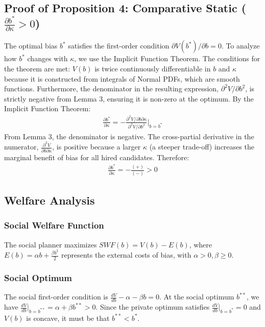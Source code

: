 \subsection{Proof of Proposition 4: Comparative Static ($\frac{\partial b^*}{\partial \kappa} > 0$)}

The optimal bias $b^*$ satisfies the first-order condition $\partial V(b^*)/\partial b = 0$. To analyze how $b^*$ changes with $\kappa$, we use the Implicit Function Theorem. The conditions for the theorem are met: $V(b)$ is twice continuously differentiable in $b$ and $\kappa$ because it is constructed from integrals of Normal PDFs, which are smooth functions. Furthermore, the denominator in the resulting expression, $\partial^2 V / \partial b^2$, is strictly negative from Lemma 3, ensuring it is non-zero at the optimum. By the Implicit Function Theorem:
\begin{align}
\frac{\partial b^*}{\partial \kappa} = -\frac{\partial^2 V / \partial b \partial \kappa}{\partial^2 V / \partial b^2}\bigg|_{b=b^*}
\end{align}
From Lemma 3, the denominator is negative. The cross-partial derivative in the numerator, $\frac{\partial^2 V}{\partial b \partial \kappa}$, is positive because a larger $\kappa$ (a steeper trade-off) increases the marginal benefit of bias for all hired candidates. Therefore:
\begin{align}
\frac{\partial b^*}{\partial \kappa} = -\frac{(+)}{(-)} > 0
\end{align}

\subsection{Welfare Analysis}

\subsubsection{Social Welfare Function}
The social planner maximizes $SWF(b) = V(b) - E(b)$, where $E(b) = \alpha b + \frac{\beta b^2}{2}$ represents the external costs of bias, with $\alpha > 0, \beta \ge 0$.

\subsubsection{Social Optimum}
The social first-order condition is $\frac{dV}{db} - \alpha - \beta b = 0$. At the social optimum $b^{**}$, we have $\frac{dV}{db}\big|_{b=b^{**}} = \alpha + \beta b^{**} > 0$. Since the private optimum satisfies $\frac{dV}{db}\big|_{b=b^*} = 0$ and $V(b)$ is concave, it must be that $b^{**} < b^*$.

